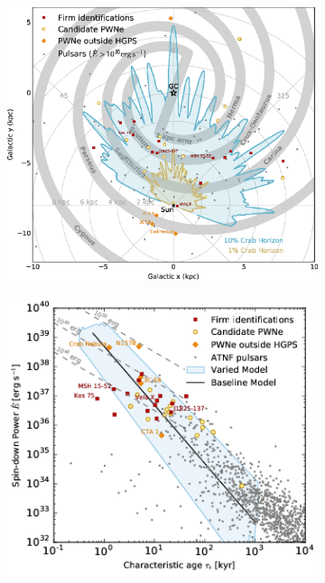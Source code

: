 \begin{figure}[b!]
	\centering
	\begin{subfigure}{0.495\textwidth}
	    \includegraphics[width=\linewidth]{04_Introduction/Images/pulsar_wind_nebula/TeV_PWN_location.eps}
	\end{subfigure}
	\hfill
	\begin{subfigure}{0.495\textwidth}
	    \includegraphics[width=\linewidth]{04_Introduction/Images/pulsar_wind_nebula/pulsar_spin_down_vs_age.png}
	\end{subfigure}
	

\end{figure}
